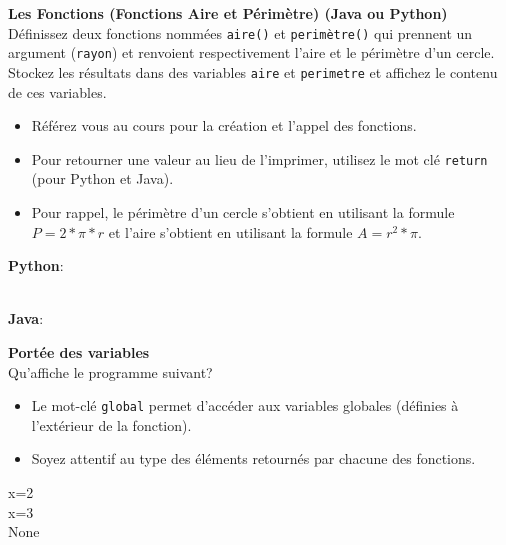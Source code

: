   \begin{Exercice}[5 minutes] \textbf{Les Fonctions (Fonctions Aire et Périmètre) (Java ou Python)}\\
      Définissez deux fonctions nommées \lstinline{aire()} et \lstinline{perimètre()} qui prennent un argument (\lstinline{rayon}) et renvoient respectivement l'aire et le périmètre d'un cercle. Stockez les résultats dans des variables \lstinline{aire} et \lstinline{perimetre} et affichez le contenu de ces variables.   \\
     
      \begin{conseil}
          \begin{itemize}
              \item Référez vous au cours pour la création et l'appel des fonctions.
              \item Pour retourner une valeur au lieu de l'imprimer, utilisez le mot clé \lstinline{return} (pour Python et Java).
              \item Pour rappel, le périmètre d'un cercle s'obtient en utilisant la formule $P = 2*\pi*r$ et l'aire s'obtient en utilisant la formule $A = r^2*\pi$.
          \end{itemize}        
      \end{conseil}
      \begin{solution}
          \textbf{Python}:
          
          \textbf{\\Java}:
      \end{solution}   
  \end{Exercice} 

  \begin{Exercice}[5 minutes] \textbf{Portée des variables}\\
    Qu'affiche le programme suivant? \\

    

    
     \begin{conseil}
        \begin{itemize}
            \item Le mot-clé \lstinline{global} permet d'accéder aux variables globales (définies à l'extérieur de la fonction).
            \item Soyez attentif au type des éléments retournés par chacune des fonctions.
        \end{itemize}
     \end{conseil}
     \begin{solution}
            x=2 \\
            x=3 \\
            None   
    \end{solution}
 \end{Exercice}

